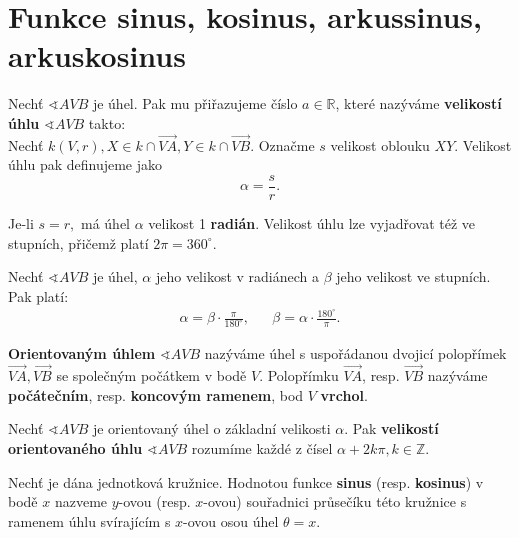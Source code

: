 \section{Funkce sinus, kosinus, arkussinus, arkuskosinus}
\begin{definition}
    Nechť $\sphericalangle AVB$ je úhel. Pak mu přiřazujeme číslo $a\in \mathbb R$,
    které nazýváme \textbf{velikostí úhlu} $\sphericalangle AVB$ takto:\\
    Nechť $k(V,r), X\in k\cap \overrightarrow{VA}, Y\in k\cap \overrightarrow{VB}.$
    Označme $s$ velikost oblouku $XY.$ Velikost úhlu pak definujeme jako
    $$\alpha = \frac{s}{r}.$$
\end{definition}

\begin{pozn}
    Je-li $s=r,$ má úhel $\alpha$ velikost 1 \textbf{radián}. Velikost úhlu lze vyjadřovat
    též ve stupních, přičemž platí $2\pi=360^\circ$.
\end{pozn}

\begin{veta}
    Nechť $\sphericalangle AVB$ je úhel, $\alpha$ jeho velikost v radiánech a $\beta$
    jeho velikost ve stupních. Pak platí:
    \begin{align*}
        \alpha = \beta\cdot \frac{\pi}{180^\circ}, & & \beta = \alpha\cdot \frac{180^\circ}{\pi}.
    \end{align*}
\end{veta}

\begin{definition}
    \textbf{Orientovaným úhlem} $\sphericalangle AVB$ nazýváme úhel s uspořádanou dvojicí
    polopřímek $\overrightarrow{VA}, \overrightarrow{VB}$ se společným počátkem v bodě $V.$
    Polopřímku $\overrightarrow{VA}$, resp. $\overrightarrow{VB}$ nazýváme \textbf{počátečním},
    resp. \textbf{koncovým ramenem}, bod $V$ \textbf{vrchol}.
\end{definition}

\begin{definition}
    Nechť $\sphericalangle AVB$ je orientovaný úhel o základní velikosti $\alpha.$ Pak
    \textbf{velikostí orientovaného úhlu} $\sphericalangle AVB$ rozumíme každé z
    čísel $\alpha +2k\pi, k \in \mathbb Z.$
\end{definition}

\begin{definition}
  Nechť je dána jednotková kružnice. Hodnotou funkce \textbf{sinus} (resp. \textbf{kosinus})
  v bodě $x$ nazveme $y$-ovou (resp. $x$-ovou) souřadnici průsečíku této kružnice s ramenem
  úhlu svírajícím s $x$-ovou osou úhel $\theta = x$.
\end{definition}

